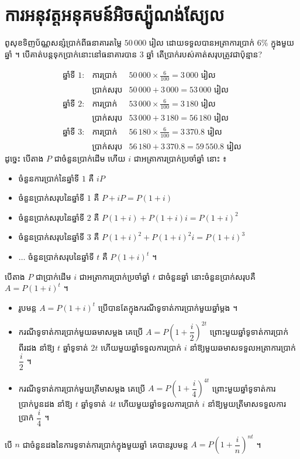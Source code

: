 \section{ការអនុវត្តអនុគមន៍អិចស្ប៉ូណង់ស្យែល}
\begin{example}[ឧទាហរណ៍]
ពូសុខទិញប័ណ្ណសន្សំប្រាក់ពីធនាគារតម្លៃ $50\,000$ រៀល ដោយទទួលបានអត្រាការប្រាក់ $6\%$ ក្នុងមួយឆ្នាំ ។ បើគាត់បន្តទុកប្រាក់នោះនៅធនាគារបាន $3$ ឆ្នាំ តើប្រាក់របស់គាត់សរុបត្រូវជាប៉ុន្មាន?
\end{example}
\[
\begin{array}{lll}
\text{ឆ្នាំទី } 1 : & \text{ការប្រាក់} & 50\,000\times\frac{6}{100} = 3\,000 \text{ រៀល}\\
 & \text{ប្រាក់សរុប} & 50\,000 + 3\,000 = 53\,000 \text{ រៀល}\\
\text{ឆ្នាំទី } 2 : & \text{ការប្រាក់} & 53\,000\times\frac{6}{100} = 3\,180 \text{ រៀល}\\
 & \text{ប្រាក់សរុប} & 53\,000 + 3\,180 = 56\,180 \text{ រៀល}\\
\text{ឆ្នាំទី } 3 : & \text{ការប្រាក់} & 56\,180\times\frac{6}{100} = 3\,370.8 \text{ រៀល}\\
 & \text{ប្រាក់សរុប} & 56\,180 + 3\,370.8 = 59\,550.8 \text{ រៀល}
\end{array}
\]
ដូច្នេះ បើតាង $P$ ជាចំនួនប្រាក់ដើម ហើយ $i$ ជាអត្រាការប្រាក់ប្រចាំឆ្នាំ នោះ ៖
\begin{itemize}
  \item ចំនួនការប្រាក់នៃឆ្នាំទី $1$ គឺ $iP$
  \item ចំនួនប្រាក់សរុបនៃឆ្នាំទី $1$ គឺ $P + iP = P(1 + i)$
  \item ចំនួនប្រាក់សរុបនៃឆ្នាំទី $2$ គឺ $P(1 + i) + P(1 + i)i = P(1 + i)^2$
  \item ចំនួនប្រាក់សរុបនៃឆ្នាំទី $3$ គឺ $P(1 + i)^2 + P(1 + i)^2i = P(1 + i)^3$
  \item $\dots$ ចំនួនប្រាក់សរុបនៃឆ្នាំទី $t$ គឺ $P(1 + i)^t$ ។
\end{itemize}
\begin{formulaBox}[ជាទូទៅ]
បើតាង $P$ ជាប្រាក់ដើម $i$ ជាអត្រាការប្រាក់ប្រចាំឆ្នាំ $t$ ជាចំនួនឆ្នាំ នោះចំនួនប្រាក់សរុបគឺ $A = P(1 + i)^t$ ។
\end{formulaBox}
\begin{note}[សម្គាល់]
\begin{itemize}
  \item រូបមន្ត $A = P(1 + i)^t$ ប្រើបានតែក្នុងករណីទូទាត់ការប្រាក់មួយឆ្នាំម្ដង ។
  \item ករណីទូទាត់ការប្រាក់មួយឆមាសម្ដង គេប្រើ $A = P\left(1 + \dfrac{i}{2}\right)^{2t}$ ព្រោះមួយឆ្នាំទូទាត់ការប្រាក់ពីរដង នាំឱ្យ $t$ ឆ្នាំទូទាត់ $2t$ ហើយមួយឆ្នាំទទួលការប្រាក់ $i$ នាំឱ្យមួយឆមាសទទួលអត្រាការប្រាក់ $\dfrac{i}{2}$ ។
  \item ករណីទូទាត់ការប្រាក់មួយត្រីមាសម្ដង គេប្រើ $A = P\left(1 + \dfrac{i}{4}\right)^{4t}$ ព្រោះមួយឆ្នាំទូទាត់ការប្រាក់បួនដង នាំឱ្យ $t$ ឆ្នាំទូទាត់ $4t$ ហើយមួយឆ្នាំទទួលការប្រាក់ $i$ នាំឱ្យមួយត្រីមាសទទួលការប្រាក់ $\dfrac{i}{4}$ ។
\end{itemize}
\end{note}
\begin{formulaBox}[ជាទូទៅ]
បើ $n$ ជាចំនួនដងនៃការទូទាត់ការប្រាក់ក្នុងមួយឆ្នាំ គេបានរូបមន្ត $A = P\left(1 + \dfrac{i}{n}\right)^{nt}$ ។
\end{formulaBox}

